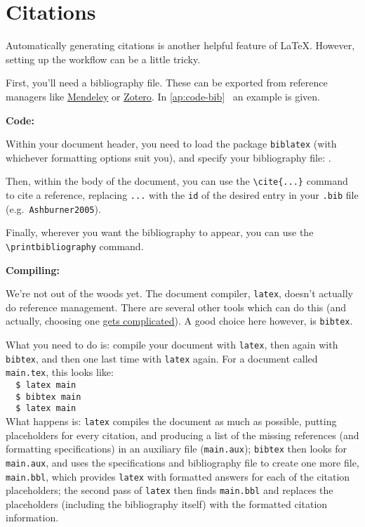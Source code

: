 \section{Citations}
Automatically generating citations is another helpful feature of \LaTeX.
However, setting up the workflow can be a little tricky.
\par
First, you'll need a bibliography file. These can be exported from reference managers like
\href{https://mendeley.com}{Mendeley} or
\href{https://www.zotero.org/}{Zotero}.
In \ref{ap:code-bib}~ an example is given.
\par
\textbf{Code:}
\par
Within your document header, you need to load the package \lstinline|biblatex|
(with whichever formatting options suit you),
and specify your bibliography file: \lstinline||.
\par
Then, within the body of the document, you can use the \lstinline|\cite{...}| command to cite a reference,
replacing \lstinline|...| with the \lstinline|id| of the desired entry in your \lstinline|.bib| file
(e.g.\ \lstinline|Ashburner2005|).
\par
Finally, wherever you want the bibliography to appear, you can use the
\lstinline|\printbibliography| command.
\par
\textbf{Compiling:}
\par
We're not out of the woods yet.
The document compiler, \lstinline|latex|, doesn't actually do reference management.
There are several other tools which can do this (and actually, choosing one
\href{https://tex.stackexchange.com/questions/25701/}{gets complicated}).
A good choice here however, is \lstinline|bibtex|.
\par
What you need to do is:
compile your document with \lstinline|latex|,
then again with \lstinline|bibtex|,
and then one last time with \lstinline|latex| again.
For a document called \lstinline|main.tex|, this looks like:\\
\lstinline|  $ latex main|\\
\lstinline|  $ bibtex main|\\
\lstinline|  $ latex main|\\
What happens is:
\lstinline|latex| compiles the document as much as possible,
putting placeholders for every citation,
and producing a list of the missing references (and formatting specifications)
in an auxiliary file (\lstinline|main.aux|);
\lstinline|bibtex| then looks for \lstinline|main.aux|,
and uses the specifications and bibliography file to create one more file, \lstinline|main.bbl|,
which provides \lstinline|latex| with formatted answers for each of the citation placeholders;
the second pass of \lstinline|latex| then finds \lstinline|main.bbl| and replaces
the placeholders (including the bibliography itself) with the formatted citation information.
\par

